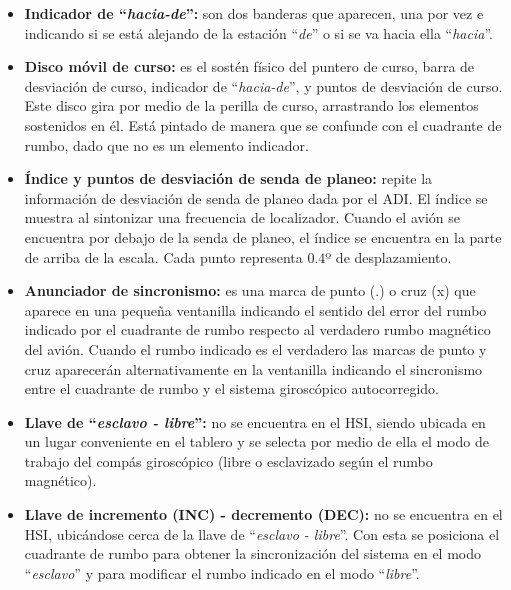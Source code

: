 \documentclass[a4paper,12pt,twoside]{article}
\begin{document}
\begin{itemize}
      \item {\bf Indicador de ``\emph{hacia-de}'': }
	son dos banderas que aparecen, una por vez e indicando si se est\'a alejando
	de la estaci\'on ``\emph{de}'' o si se va hacia ella ``\emph{hacia}''.

      \item {\bf Disco m\'ovil de curso: }
	es el sost\'en f\'isico del puntero de curso, barra de desviaci\'on de curso,
	indicador de ``\emph{hacia-de}'', y puntos de desviaci\'on de curso.
	Este disco gira por medio de la perilla de curso, arrastrando los elementos
	sostenidos en \'el. Est\'a pintado de manera que se confunde con el
	cuadrante de rumbo, dado que no es un elemento indicador.

      \item {\bf \'Indice y puntos de desviaci\'on de senda de planeo: }
	repite la informaci\'on de desviaci\'on de senda de planeo dada por el ADI.
	El \'indice se muestra al sintonizar una frecuencia de localizador.
	Cuando el avi\'on se encuentra por debajo de la senda de planeo, 
	el \'indice se encuentra en la parte de arriba de la escala.
	Cada punto representa $0.4$º de desplazamiento.

      \item {\bf Anunciador de sincronismo:}
	es una marca de punto (.) o cruz (x) que aparece en una peque\~na ventanilla
	indicando el sentido del error del rumbo indicado por el cuadrante de
	rumbo respecto al verdadero rumbo magn\'etico del avi\'on.
	Cuando el rumbo indicado es el verdadero las marcas de punto y cruz
	aparecer\'an alternativamente en la ventanilla indicando el sincronismo
	entre el cuadrante de rumbo y el sistema girosc\'opico autocorregido.

      \item {\bf Llave de ``\emph{esclavo - libre}'': }
	no se encuentra en el HSI, siendo ubicada en un lugar conveniente en el tablero
	y se selecta por medio de ella el modo de trabajo del comp\'as 
	girosc\'opico (libre o esclavizado seg\'un el rumbo magn\'etico).

      \item {\bf Llave de incremento (INC) - decremento (DEC): }
	no se encuentra 
	en el HSI, ubic\'andose cerca de la llave de   ``\emph{esclavo - libre}''.
	Con esta se posiciona el cuadrante de rumbo para obtener la
	sincronizaci\'on del sistema en el modo ``\emph{esclavo}'' y para
	modificar el rumbo indicado en el modo ``\emph{libre}''.

\end{itemize}
\end{document}
